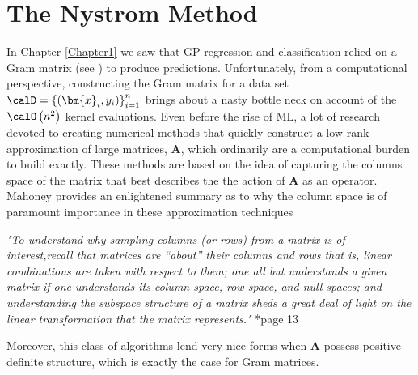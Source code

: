 \section{The Nystrom Method}\label{Chapter2}
In Chapter \ref{Chapter1} we saw that GP regression and classification relied on a Gram matrix (see ) to produce predictions. Unfortunately, from a computational perspective, constructing the Gram matrix for a data set $\calD = \left\{ \left( \bm{x}_i , y_{i} \right) \right\}_{i=1}^{n}$ brings about a nasty bottle neck on account of the $\calO \left( n^2 \right)$ kernel evaluations. Even before the rise of ML, a lot of research devoted to creating numerical methods that quickly construct a low rank approximation of large matrices, $\bm{A}$, which ordinarily are a computational burden to build exactly. These methods are based on the idea of capturing the columns space of the matrix that best describes the the action of $\bm{A}$ as an operator. Mahoney provides an enlightened summary as to why the column space is of paramount importance in these approximation techniques
\begin{center}
    \emph{"To understand why sampling columns (or rows) from a matrix is of interest,recall that matrices are “about” their columns and rows that is, linear combinations are taken with respect to them; one all but understands a given matrix if one understands its column space, row space, and null
        spaces; and understanding the subspace structure of a matrix sheds a great deal of light on the linear transformation that the matrix represents."} \cite{DBLP:journals/corr/abs-1104-5557}*{page 13}
\end{center}
Moreover, this class of algorithms lend very nice forms when $\bm{A}$ possess positive definite structure, which is exactly the case for Gram matrices.







